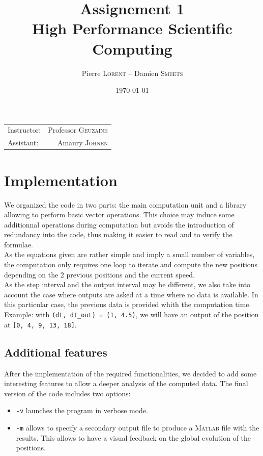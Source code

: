 \documentclass{article}
\title{Assignement 1 \\ High Performance Scientific Computing} %
\author{Pierre \textsc{Lorent} -- Damien \textsc{Smeets}} %
\date{\today} %
\begin{document}
\maketitle %

\begin{center}
\begin{tabular}{l r}
Instructor: & Professor \textsc{Geuzaine}\\ %
Assistant: & Amaury \textsc{Johnen}
\end{tabular}
\end{center}

\section*{Implementation}
We organized the code in two parts: the main computation unit and a library allowing to perform basic vector operations. This choice may induce some additionnal operations during computation but avoids the introduction of redundancy into the code, thus making it easier to read and to verify the formulae.\\

As the equations given are rather simple and imply a small number of variables, the computation only requires one loop to iterate and compute the new positions depending on the 2 previous positions and the current speed.\\

As the step interval and the output interval may be different, we also take into account the case where outputs are asked at a time where no data is available. In this particular case, the previous data is provided whith the computation time. Example: with \texttt{(dt, dt\_out) = (1, 4.5)}, we will have an output of the position at \texttt{[0, 4, 9, 13, 18]}.


\subsection*{Additional features}
After the implementation of the required functionalities, we decided to add some interesting features to allow a deeper analysis of the computed data. The final version of the code includes two options:
\begin{itemize}
\item \texttt{-v} launches the program in verbose mode.
\item \texttt{-m} allows to specify a secondary output file to produce a \textsc{Matlab} file with the results. This allows to have a visual feedback on the global evolution of the positions.
\end{itemize}
\end{document}
